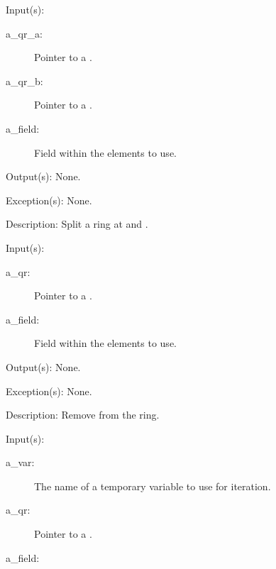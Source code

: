 \begin{capi}
	\begin{capilist}
	\item[Input(s): ]
		\begin{description}\item[]
		\item[a\_qr\_a: ]
			Pointer to a .
		\item[a\_qr\_b: ]
			Pointer to a .
		\item[a\_field: ]
			Field within the  elements to use.
		\end{description}
	\item[Output(s): ] None.
	\item[Exception(s): ] None.
	\item[Description: ]
		Split a ring at  and .
	\end{capilist}
\label{qr_remove}
	\begin{capilist}
	\item[Input(s): ]
		\begin{description}\item[]
		\item[a\_qr: ]
			Pointer to a \classname{qr}.
		\item[a\_field: ]
			Field within the  elements to use.
		\end{description}
	\item[Output(s): ] None.
	\item[Exception(s): ] None.
	\item[Description: ]
		Remove  from the ring.
	\end{capilist}
\label{qr_foreach}
	\begin{capilist}
	\item[Input(s): ]
		\begin{description}\item[]
		\item[a\_var: ]
			The name of a temporary variable to use for iteration.
		\item[a\_qr: ]
			Pointer to a .
		\item[a\_field: ]

\end{description}
\end{capilist}
\end{capi}

